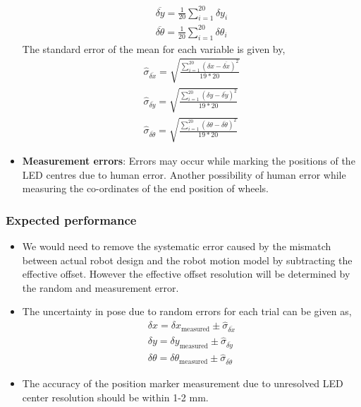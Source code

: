 \begin{itemize}
\begin{align*}
\overline{\delta y} = \frac{1}{20} \sum_{i=1}^{20} \delta y_i \\
\overline{\delta \theta} = \frac{1}{20} \sum_{i=1}^{20} \delta \theta_i
\end{align*}
The standard error of the mean for each variable is given by,
\begin{align*}
\hat{\sigma}_{\overline{\delta x}} = \sqrt{\frac{\sum_{i=1}^{20} (\delta x - \overline{\delta x})^2}{19 * 20}} \\
\hat{\sigma}_{\overline{\delta y}} = \sqrt{\frac{\sum_{i=1}^{20} (\delta y - \overline{\delta y})^2}{19 * 20}} \\
\hat{\sigma}_{\overline{\delta \theta}} = \sqrt{\frac{\sum_{i=1}^{20} (\delta \theta - \overline{\delta \theta})^2}{19 * 20}}
\end{align*}

\item \textbf{Measurement errors}: Errors may occur while marking the positions of the LED centres due to human error. Another possibility of human error while measuring the co-ordinates of the end position of wheels.   

\end{itemize}


\subsubsection*{Expected performance}
\begin{itemize}
\item We would need to remove the systematic error caused by the mismatch between actual robot design and the robot motion model by subtracting the effective offset. However the effective offset resolution will be determined by the random and measurement error.
\item The uncertainty in pose due to random errors for each trial can be given as,
\begin{align*}
\delta x = \delta x_{\text{measured}} \pm \hat{\sigma}_{\overline{\delta x}} \\
\delta y = \delta y_{\text{measured}} \pm \hat{\sigma}_{\overline{\delta y}} \\
\delta \theta = \delta \theta_{\text{measured}} \pm \hat{\sigma}_{\overline{\delta \theta}}
\end{align*}
\item The accuracy of the position marker measurement due to unresolved LED center resolution should be within 1-2 mm.
\end{itemize}

